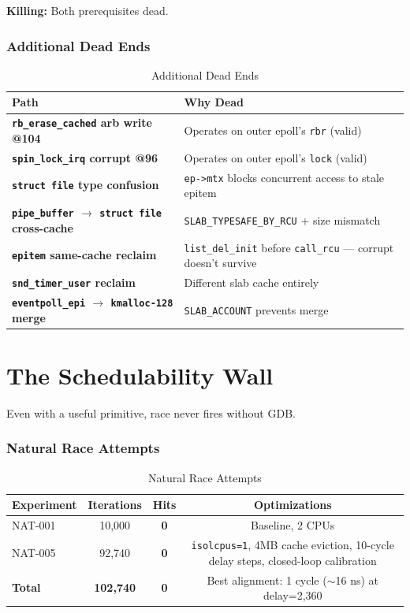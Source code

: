 \documentclass[11pt,a4paper]{article}
\begin{document}
\textbf{Killing:} Both prerequisites dead.

\subsubsection{Additional Dead Ends}

\begin{table}[H]
\centering
\caption{Additional Dead Ends}
\begin{tabularx}{\textwidth}{>{\bfseries\color{accent}}l X}
\toprule
\textbf{Path} & \textbf{Why Dead} \\
\midrule
\texttt{rb\_erase\_cached} arb write @104 & Operates on outer epoll's \texttt{rbr} (valid) \\
\texttt{spin\_lock\_irq} corrupt @96 & Operates on outer epoll's \texttt{lock} (valid) \\
\texttt{struct file} type confusion & \texttt{ep->mtx} blocks concurrent access to stale epitem \\
\texttt{pipe\_buffer} $\to$ \texttt{struct file} cross-cache & \texttt{SLAB\_TYPESAFE\_BY\_RCU} + size mismatch \\
\texttt{epitem} same-cache reclaim & \texttt{list\_del\_init} before \texttt{call\_rcu} --- corrupt doesn't survive \\
\texttt{snd\_timer\_user} reclaim & Different slab cache entirely \\
\texttt{eventpoll\_epi} $\to$ \texttt{kmalloc-128} merge & \texttt{SLAB\_ACCOUNT} prevents merge \\
\bottomrule
\end{tabularx}
\end{table}

\newpage

\section{The Schedulability Wall}

Even with a useful primitive, race never fires without GDB.

\subsubsection{Natural Race Attempts}

\begin{table}[H]
\centering
\caption{Natural Race Attempts}
\begin{tabular}{lccc}
\toprule
\textbf{Experiment} & \textbf{Iterations} & \textbf{Hits} & \textbf{Optimizations} \\
\midrule
NAT-001 & 10,000 & \textbf{0} & Baseline, 2 CPUs \\
NAT-005 & 92,740 & \textbf{0} & \texttt{isolcpus=1}, 4MB cache eviction, 10-cycle delay steps, closed-loop calibration \\
\textbf{Total} & \textbf{102,740} & \textbf{0} & Best alignment: 1 cycle ($\sim$16 ns) at delay=2,360 \\
\bottomrule
\end{tabular}
\end{table}
\end{document}
